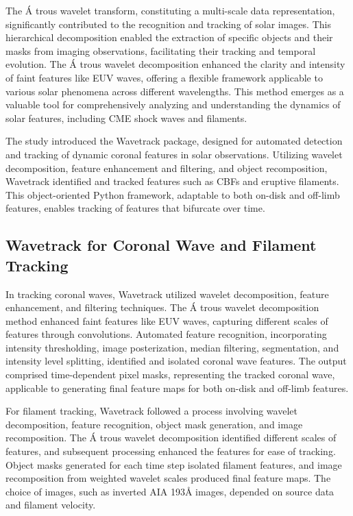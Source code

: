 The \'A trous wavelet transform, constituting a multi-scale data representation, significantly contributed to the recognition and tracking of solar images. This hierarchical decomposition enabled the extraction of specific objects and their masks from imaging observations, facilitating their tracking and temporal evolution. The \'A trous wavelet decomposition enhanced the clarity and intensity of faint features like EUV waves, offering a flexible framework applicable to various solar phenomena across different wavelengths. This method emerges as a valuable tool for comprehensively analyzing and understanding the dynamics of solar features, including CME shock waves and filaments.

The study introduced the Wavetrack package, designed for automated detection and tracking of dynamic coronal features in solar observations. Utilizing wavelet decomposition, feature enhancement and filtering, and object recomposition, Wavetrack identified and tracked features such as CBFs and eruptive filaments. This object-oriented Python framework, adaptable to both on-disk and off-limb features, enables tracking of features that bifurcate over time.

\subsection{Wavetrack for Coronal Wave and Filament Tracking}
In tracking coronal waves, Wavetrack utilized wavelet decomposition, feature enhancement, and filtering techniques. The \'A trous wavelet decomposition method enhanced faint features like EUV waves, capturing different scales of features through convolutions. Automated feature recognition, incorporating intensity thresholding, image posterization, median filtering, segmentation, and intensity level splitting, identified and isolated coronal wave features. The output comprised time-dependent pixel masks, representing the tracked coronal wave, applicable to generating final feature maps for both on-disk and off-limb features.

For filament tracking, Wavetrack followed a process involving wavelet decomposition, feature recognition, object mask generation, and image recomposition. The \'A trous wavelet decomposition identified different scales of features, and subsequent processing enhanced the features for ease of tracking. Object masks generated for each time step isolated filament features, and image recomposition from weighted wavelet scales produced final feature maps. The choice of images, such as inverted AIA 193Å images, depended on source data and filament velocity.

